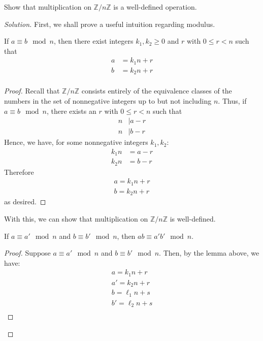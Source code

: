 \documentclass[12pt]{article}
\newenvironment{problem}[2][Problem]{\begin{trivlist}
\item[\hskip \labelsep {\bfseries #1}\hskip \labelsep {\bfseries #2.}]}{\end{trivlist}}
\newenvironment{proposition}[1][Proposition]{\begin{trivlist}
\item[\hskip \labelsep {\bfseries #1.}]}{\end{trivlist}}
\newenvironment{solution}
  {\renewcommand\qedsymbol{$\blacksquare$}\begin{proof}[Solution]}
{\end{proof}}
\begin{document}
\begin{problem}{2.14}
  Show that multiplication on $\mathbb{Z}/n\mathbb{Z}$ is a well-defined operation.
\end{problem}
\begin{solution}
  First, we shall prove a useful intuition regarding modulus.
  \begin{proposition}
    If $a\equiv b\mod n$, then there exist integers $k_1,k_2\geq0$ and $r$ with $0\leq r<n$ such that
    \begin{align*}
      a&=k_1n+r\\
      b&=k_2n+r\\
    \end{align*}
  \end{proposition}
  \begin{proof}
    Recall that $\mathbb{Z}/n\mathbb{Z}$ consists entirely of the equivalence classes of the numbers in the set
    of nonnegative integers up to but not including $n$. Thus, if $a\equiv b\mod n$, there exists an
    $r$ with $0\leq r<n$ such that
    \begin{align*}
      n&|a-r\\
      n&|b-r
    \end{align*}
    Hence, we have, for some nonnegative integers $k_1, k_2$:
    \begin{align*}
      k_1n &= a-r\\
      k_2n &= b-r
    \end{align*}
    Therefore
    \begin{align*}
      a = k_1n + r\\
      b = k_2n + r
    \end{align*}
    as desired.
  \end{proof}
  With this, we can show that multiplication on $\mathbb{Z}/n\mathbb{Z}$ is well-defined.
  \begin{proposition}
    If $a\equiv a'\mod n$ and $b\equiv b'\mod n$, then $ab\equiv a'b'\mod n$.
  \end{proposition}
  \begin{proof}
    Suppose $a\equiv a'\mod n$ and $b\equiv b'\mod n$. 
    Then, by the lemma above, we have:
    \begin{align*}
      a = k_1n + r \\
      a' = k_2n + r \\
      b = \ell_1n+s \\
      b' = \ell_2n+s \\
    \end{align*}

\end{proof}
\end{solution}
\end{document}
